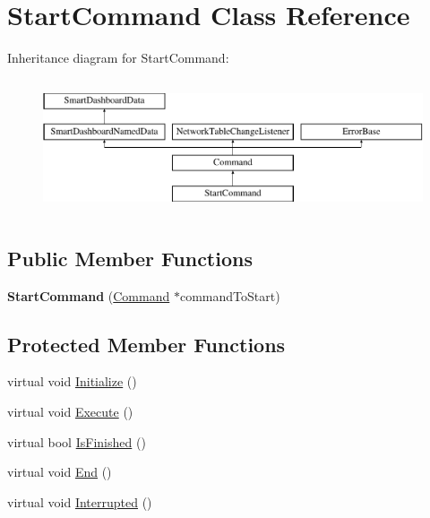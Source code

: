 \hypertarget{classStartCommand}{
\section{StartCommand Class Reference}
\label{classStartCommand}
}
Inheritance diagram for StartCommand:\begin{figure}[H]
\begin{center}
\leavevmode
\includegraphics[height=4.000000cm]{classStartCommand}
\end{center}
\end{figure}
\subsection*{Public Member Functions}
\begin{DoxyCompactItemize}
\item 
\hypertarget{classStartCommand_a3e7ccbd1ec878b8f6fd57ce9c04e9c9b}{
{\bfseries StartCommand} (\hyperlink{classCommand}{Command} $\ast$commandToStart)}
\label{classStartCommand_a3e7ccbd1ec878b8f6fd57ce9c04e9c9b}

\end{DoxyCompactItemize}
\subsection*{Protected Member Functions}
\begin{DoxyCompactItemize}
\item 
virtual void \hyperlink{classStartCommand_a7e0382765f67e6c31e1786f43c6d4c4d}{Initialize} ()
\item 
virtual void \hyperlink{classStartCommand_aa6e8b7450ffe7af7a894cb35011ac093}{Execute} ()
\item 
virtual bool \hyperlink{classStartCommand_aa9bb1889310d8fd8ffe18889cc14b4c6}{IsFinished} ()
\item 
virtual void \hyperlink{classStartCommand_a0115112b1fe5041d40000f74da97c32c}{End} ()
\item 
virtual void \hyperlink{classStartCommand_a9e6d49b15e6ca602cc621408cc4b035c}{Interrupted} ()
\end{DoxyCompactItemize}


